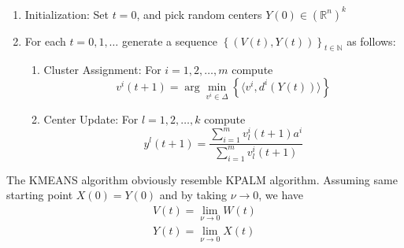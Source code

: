 \documentclass[11pt]{article}
\numberwithin{equation}{section}
\begin{document}
\begin{enumerate}[(1)]
	\item Initialization: Set $t=0$, and pick random centers $Y(0) \in (\mathbb{R}^n)^k$

	\item For each $t=0,1, \ldots$ generate a sequence $\left\lbrace(V(t),Y(t))\right\rbrace_{t \in \mathbb{N}}$ as follows:
	\begin{enumerate}[(2.1)]
		\item Cluster Assignment: For $i=1, 2, \ldots ,m$ compute
		\begin{equation}
			v^i(t+1) = \arg\min\limits_{v^i \in \Delta} \left\lbrace \langle v^i , d^i(Y(t)) \rangle\right\rbrace \label{StateEq12}
		\end{equation}
		
		\item Center Update: For $l=1, 2, \ldots ,k$ compute
		\begin{equation}
			y^l(t+1) = \frac{\sum_{i=1}^{m} v^i_l(t+1) a^i}{\sum_{i=1}^{m} v^i_l(t+1)} \label{StateEq13}
		\end{equation}
	\end{enumerate}
\end{enumerate}
The KMEANS algorithm obviously resemble KPALM algorithm. Assuming same starting point $X(0) = Y(0)$ and by taking $\nu \to 0$, we have
\begin{equation*}
	\begin{split}
	V(t) = \lim_{\nu \to 0} W(t) \\
	Y(t) = \lim_{\nu \to 0} X(t)
	\end{split}
\end{equation*}

\newpage
\end{document}
